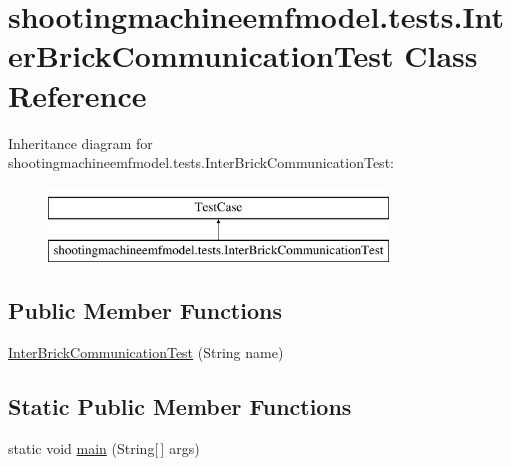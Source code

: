 \hypertarget{classshootingmachineemfmodel_1_1tests_1_1_inter_brick_communication_test}{\section{shootingmachineemfmodel.\-tests.\-Inter\-Brick\-Communication\-Test Class Reference}
\label{classshootingmachineemfmodel_1_1tests_1_1_inter_brick_communication_test}
}
Inheritance diagram for shootingmachineemfmodel.\-tests.\-Inter\-Brick\-Communication\-Test\-:\begin{figure}[H]
\begin{center}
\leavevmode
\includegraphics[height=2.000000cm]{classshootingmachineemfmodel_1_1tests_1_1_inter_brick_communication_test}
\end{center}
\end{figure}
\subsection*{Public Member Functions}
\begin{DoxyCompactItemize}
\item 
\hyperlink{classshootingmachineemfmodel_1_1tests_1_1_inter_brick_communication_test_ae2301c47996bc198f0588d73e170d05d}{Inter\-Brick\-Communication\-Test} (String name)
\end{DoxyCompactItemize}
\subsection*{Static Public Member Functions}
\begin{DoxyCompactItemize}
\item 
static void \hyperlink{classshootingmachineemfmodel_1_1tests_1_1_inter_brick_communication_test_a1747abbbb364f26a37309c61012f8d6c}{main} (String\mbox{[}$\,$\mbox{]} args)
\end{DoxyCompactItemize}
